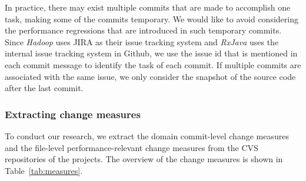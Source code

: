 In practice, there may exist multiple commits that are made to accomplish one task, making some of the commits temporary. We would like to avoid considering the performance regressions that are introduced in such temporary commits. Since \emph{Hadoop} uses JIRA as their issue tracking system and \emph{RxJava} uses the internal issue tracking system in Github, we use the issue id that is mentioned in each commit message to identify the task of each commit. If multiple commits are associated with the same issue, we only consider the snapshot of the source code after the last commit. 
\subsubsection{Extracting change measures}
To conduct our research, we extract the domain commit-level change measures and the file-level performance-relevant change measures from the CVS repositories of the projects. The overview of the change measures is shown in Table~\ref{tab:measures}. 

